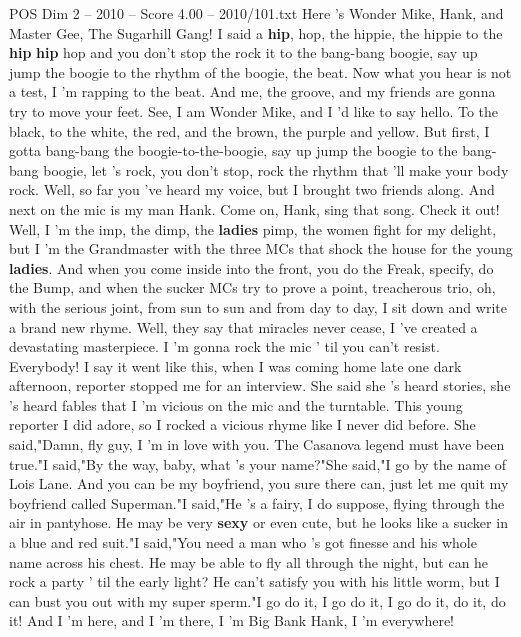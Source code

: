 \begin{textsample}{POS Dim 2 – 2010 – Score 4.00 – 2010/101.txt}  \label{ex:f2_pos_031}
Here 's Wonder Mike, Hank, and Master Gee, The Sugarhill Gang!
I said a \textbf{hip}, hop, the hippie, the hippie to the \textbf{hip} \textbf{hip} hop and you don't stop the rock it to the bang-bang boogie, say up jump the boogie to the rhythm of the boogie, the beat.
Now what you hear is not a test, I 'm rapping to the beat.
And me, the groove, and my friends are gonna try to move your feet.
See, I am Wonder Mike, and I 'd like to say hello.
To the black, to the white, the red, and the brown, the purple and yellow.
But first, I gotta bang-bang the boogie-to-the-boogie, say up jump the boogie to the bang-bang boogie, let 's rock, you don't stop, rock the rhythm that 'll make your body rock.
Well, so far you 've heard my voice, but I brought two friends along.
And next on the mic is my man Hank.
Come on, Hank, sing that song.
Check it out!
Well, I 'm the imp, the dimp, the \textbf{ladies} pimp, the women fight for my delight, but I 'm the Grandmaster with the three MCs that shock the house for the young \textbf{ladies}.
And when you come inside into the front, you do the Freak, specify, do the Bump, and when the sucker MCs try to prove a point, treacherous trio, oh, with the serious joint, from sun to sun and from day to day, I sit down and write a brand new rhyme.
Well, they say that miracles never cease, I 've created a devastating masterpiece.
I 'm gonna rock the mic ' til you can't resist.
Everybody!
I say it went like this, when I was coming home late one dark afternoon, reporter stopped me for an interview.
She said she 's heard stories, she 's heard fables that I 'm vicious on the mic and the turntable.
This young reporter I did adore, so I rocked a vicious rhyme like I never did before.
She said,"Damn, fly guy, I 'm in love with you.
The Casanova legend must have been true."I said,"By the way, baby, what 's your name?"She said,"I go by the name of Lois Lane.
And you can be my boyfriend, you sure there can, just let me quit my boyfriend called Superman."I said,"He 's a fairy, I do suppose, flying through the air in pantyhose.
He may be very \textbf{sexy} or even cute, but he looks like a sucker in a blue and red suit."I said,"You need a man who 's got finesse and his whole name across his chest.
He may be able to fly all through the night, but can he rock a party ' til the early light?
He can't satisfy you with his little worm, but I can bust you out with my super sperm."I go do it, I go do it, I go do it, do it, do it!
And I 'm here, and I 'm there, I 'm Big Bank Hank, I 'm everywhere!

\end{textsample}
